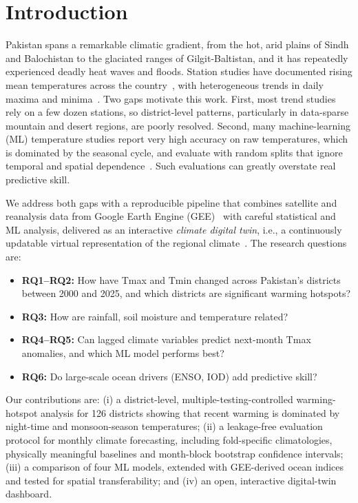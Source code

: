 \documentclass[conference]{IEEEtran}
\begin{document}
\section{Introduction}
Pakistan spans a remarkable climatic gradient, from the hot, arid plains of Sindh and Balochistan to the glaciated ranges of Gilgit-Baltistan, and it has repeatedly experienced deadly heat waves and floods. Station studies have documented rising mean temperatures across the country~\cite{delrio2013}, with heterogeneous trends in daily maxima and minima~\cite{iqbal2016}. Two gaps motivate this work. First, most trend studies rely on a few dozen stations, so district-level patterns, particularly in data-sparse mountain and desert regions, are poorly resolved. Second, many machine-learning (ML) temperature studies report very high accuracy on raw temperatures, which is dominated by the seasonal cycle, and evaluate with random splits that ignore temporal and spatial dependence~\cite{roberts2017}. Such evaluations can greatly overstate real predictive skill.

We address both gaps with a reproducible pipeline that combines satellite and reanalysis data from Google Earth Engine (GEE)~\cite{gorelick2017} with careful statistical and ML analysis, delivered as an interactive \emph{climate digital twin}, i.e., a continuously updatable virtual representation of the regional climate~\cite{bauer2021}. The research questions are:
\begin{itemize}
\item \textbf{RQ1--RQ2:} How have Tmax and Tmin changed across Pakistan's districts between 2000 and 2025, and which districts are significant warming hotspots?
\item \textbf{RQ3:} How are rainfall, soil moisture and temperature related?
\item \textbf{RQ4--RQ5:} Can lagged climate variables predict next-month Tmax anomalies, and which ML model performs best?
\item \textbf{RQ6:} Do large-scale ocean drivers (ENSO, IOD) add predictive skill?
\end{itemize}

Our contributions are: (i) a district-level, multiple-testing-controlled warming-hotspot analysis for 126 districts showing that recent warming is dominated by night-time and monsoon-season temperatures; (ii) a leakage-free evaluation protocol for monthly climate forecasting, including fold-specific climatologies, physically meaningful baselines and month-block bootstrap confidence intervals; (iii) a comparison of four ML models, extended with GEE-derived ocean indices and tested for spatial transferability; and (iv) an open, interactive digital-twin dashboard.
\end{document}
